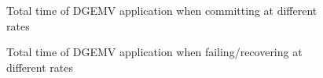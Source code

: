 \begin{figure}[t!]
\begin{center}
\end{center}
\caption{Total time of DGEMV application when committing at different rates}
\label{fig:dgemv_total_time_commit}
\end{figure}

\begin{figure}[t!]
\begin{center}
\end{center}
\caption{Total time of DGEMV application when failing/recovering at different rates}
\label{fig:dgemv_total_time_fail}
\end{figure}

